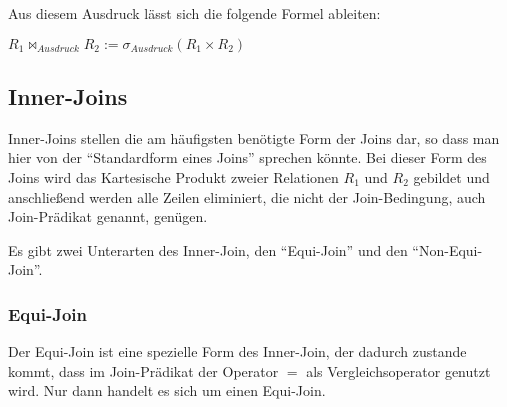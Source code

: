 Aus diesem Ausdruck lässt sich die folgende Formel ableiten:

$R_1\bowtie _{Ausdruck} R_2 := \sigma_{Ausdruck}(R_1 \times R_2)$
\subsection{Inner-Joins}
Inner-Joins stellen die am häufigsten benötigte Form der Joins dar, so dass man hier von der \enquote{Standardform eines Joins} sprechen könnte. Bei dieser Form des Joins wird das Kartesische Produkt zweier Relationen $R_1$ und $R_2$ gebildet und anschließend werden alle Zeilen eliminiert, die nicht der Join-Bedingung, auch Join-Prädikat genannt, genügen.

Es gibt zwei Unterarten des Inner-Join, den \enquote{Equi-Join} und den \enquote{Non-Equi-Join}.
\subsubsection{Equi-Join}
Der Equi-Join ist eine spezielle Form des Inner-Join, der dadurch zustande kommt, dass im Join-Prädikat der Operator $=$ als Vergleichsoperator genutzt wird. Nur dann handelt es sich um einen Equi-Join.

